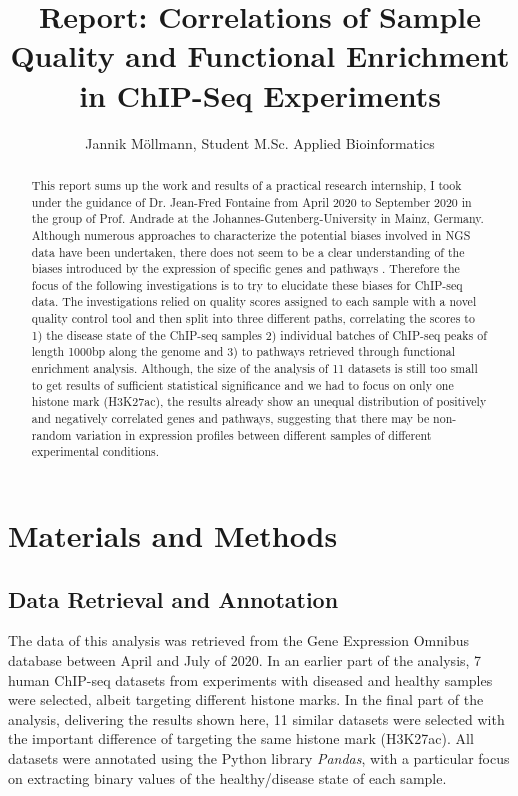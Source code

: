 \documentclass[5p]{elsarticle}
\begin{document}
\begin{frontmatter}
	\title{Report: Correlations of Sample Quality and Functional Enrichment in ChIP-Seq Experiments}
	\author{Jannik Möllmann, Student M.Sc. Applied Bioinformatics}

	\begin{abstract}
		This report sums up the work and results of a practical research internship, I took under the guidance of Dr. Jean-Fred Fontaine from April 2020 to September 2020 in the group of Prof. Andrade at the Johannes-Gutenberg-University in Mainz, Germany. Although numerous approaches to characterize the potential biases involved in NGS data have been undertaken, there does not seem to be a clear understanding of the biases introduced by the expression of specific genes and pathways \cite{chen_systematic_2012,cheung_systematic_2011,park_widespread_2013,ramachandran_bidchips_2015,teng_accounting_2017,wang_correcting_2017}. Therefore the focus of the following investigations is to try to elucidate these biases for ChIP-seq data. The investigations relied on quality scores assigned to each sample with a novel quality control tool \cite{albrecht_automated_2020} and then split into three different paths, correlating the scores to 1) the disease state of the ChIP-seq samples 2) individual batches of ChIP-seq peaks of length 1000bp along the genome and 3) to pathways retrieved through functional enrichment analysis. Although, the size of the analysis of 11 datasets is still too small to get results of sufficient statistical significance and we had to focus on only one histone mark (H3K27ac), the results already show an unequal distribution of positively and negatively correlated genes and pathways, suggesting that there may be non-random variation in expression profiles between different samples of different experimental conditions. 
	\end{abstract}
\end{frontmatter}


\section{Materials and Methods}

\subsection{Data Retrieval and Annotation}
The data of this analysis was retrieved from the Gene Expression Omnibus database between April and July of 2020. In an earlier part of the analysis, 7 human ChIP-seq datasets from experiments with diseased and healthy samples were selected, albeit targeting different histone marks. In the final part of the analysis, delivering the results shown here, 11 similar datasets were selected with the important difference of targeting the same histone mark (H3K27ac). All datasets were annotated using the Python library \textit{Pandas}, with a particular focus on extracting binary values of the healthy/disease state of each sample.
\end{document}
